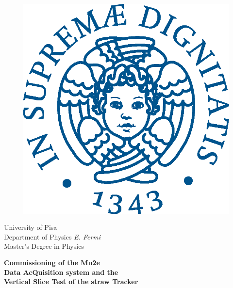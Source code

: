 \begin{titlepage}
\begin{figure}[!htb]
    \centering
    \includegraphics[keepaspectratio=true,scale=0.5]{figures/eps/cherubinFrontespizio.eps}
\end{figure}

\begin{center}
    \LARGE{University of Pisa}
    \vspace{5mm}
    \\ \large{Department of Physics \textit{E. Fermi}}
    \vspace{5mm}
    \\ \LARGE{Master's Degree in Physics}
\end{center}

\vspace{15mm}
\begin{center}
    {\Large{\bf Commissioning of the Mu2e\\ \vspace{3mm} Data AcQuisition system and the\\ \vspace{5mm} Vertical Slice Test of the straw Tracker}}
    
    

\end{center}
\end{titlepage}
